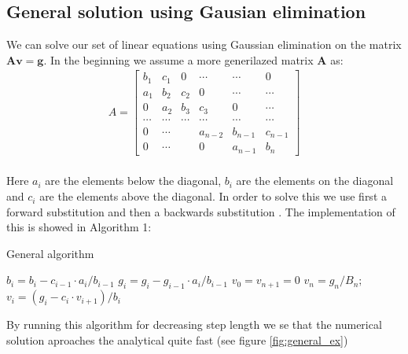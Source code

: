 \documentclass[american,a4paper,12pt]{article}
\renewcommand{\vec}[1]{\mathbf{#1}} %
\begin{document}
\subsection{General solution using Gausian elimination}
We can solve our set of linear equations using Gaussian elimination on the matrix $\vec{A}\vec{v} = \vec{g}$. In the beginning we assume a more generilazed matrix $\vec{A}$ as:
\begin{align*}
  A =
  \begin{bmatrix}
    b_1 & c_1 & 0 & \cdots & \cdots & 0 \\
    a_1 & b_2 & c_2 & 0 & \cdots & \cdots \\
    0 & a_2 & b_3 & c_3 & 0 & \cdots \\
    \cdots & \cdots & \cdots & \cdots & \cdots & \cdots \\
    0 & \cdots & & a_{n-2} & b_{n-1} & c_{n-1} \\
    0 & \cdots & & 0 & a_{n-1} & b_n
  \end{bmatrix}
\end{align*}
\\ Here $a_i$ are the elements below the diagonal, $b_i$ are the elements on the diagonal and $c_i$ are the elements above the diagonal. In order to solve this we use first a forward substitution and then a backwards substitution \cite{linalg}. The implementation of this is showed in Algorithm 1:
\begin{algorithm}[H]
\caption{General algorithm}
\begin{algorithmic}[1] %
   
    \State $b_i = b_i - c_{i-1}\cdot {a_i}/{{b}_{i-1}}$ 
    \State $g_i = g_i - {g}_{i-1}\cdot {a_i}/{{b}_{i-1}}$ 
  \EndFor
  \Statex
  \State $v_0 = v_{n+1} = 0$ 
  \State $v_n = g_n/B_n;$
    \State $v_i = (g_i - c_i\cdot v_{i+1})/b_i$ %
  \EndFor
\end{algorithmic}
\end{algorithm}
By running this algorithm for decreasing step length we se that the numerical solution aproaches the analytical quite fast (see figure \ref{fig:general_ex})
\end{document}

